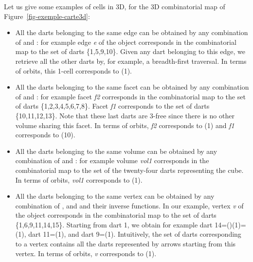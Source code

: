 Let us give some examples of cells in 3D, for the 3D combinatorial map
of Figure~\ref{fig-exemple-carte3d}:
\begin{itemize}
\item All the darts belonging to the same edge can be obtained by any
  combination of \betadeux{} and \betatrois{}: for example edge \emph{e} of the
  object corresponds in the combinatorial map to the set of darts
  \{1,5,9,10\}. Given any dart belonging to this edge, we retrieve
  all the other darts by, for example, a breadth-first traversal. In terms
  of orbits, this 1-cell corresponds to \orbit{\betadeux{},\betatrois{}}(1).

\item All the darts belonging to the same facet can be obtained by any
  combination of \betaun{} and \betatrois{}: for example facet \emph{f2}
  corresponds in the combinatorial map to the set of darts
  \{1,2,3,4,5,6,7,8\}. Facet \emph{f1} corresponds to the set of darts
  \{10,11,12,13\}. Note that these last darts are 3-free since
  there is no other volume sharing this facet.  In terms of orbits,
  \emph{f2} corresponds to \orbit{\betaun{},\betatrois{}}(1) and \emph{f1}
  corresponds to \orbit{\betaun{},\betatrois{}}(10).

\item All the darts belonging to the same volume can be obtained by
  any combination of \betaun{} and \betadeux{}: for example volume \emph{vol1}
  corresponds in the combinatorial map to the set of the twenty-four
  darts representing the cube. In terms of orbits, \emph{vol1} corresponds
  to \orbit{\betaun{},\betadeux{}}(1).

\item All the darts belonging to the same vertex can be obtained by
  any combination of \betaun{}\comp{}\betadeux{},
  \betaun{}\comp{}\betatrois{} and \betadeux{}\comp{}\betatrois{} and their inverse
  functions.  In our example, vertex \emph{v} of the object corresponds
  in the combinatorial map to the set of darts \{1,6,9,11,14,15\}.
  Starting from dart 1, we obtain for example dart
  14=(\betaun{}\comp{}\betadeux{})(1)=\betadeux{}\comp{}\betazero{}(1), dart
  11=\betaun{}\comp{}\betadeux{}(1), and dart 9=\betadeux{}\comp{}\betatrois{}(1).
  Intuitively, the set of darts corresponding to a vertex contains all
  the darts represented by arrows starting from this vertex.  In terms
  of orbits, \emph{v} corresponds to \orbit{\betaun{}\comp{}\betadeux{},
    \betaun{}\comp{}\betatrois{}, \betadeux{}\comp{}\betatrois{}}(1).
\end{itemize}

